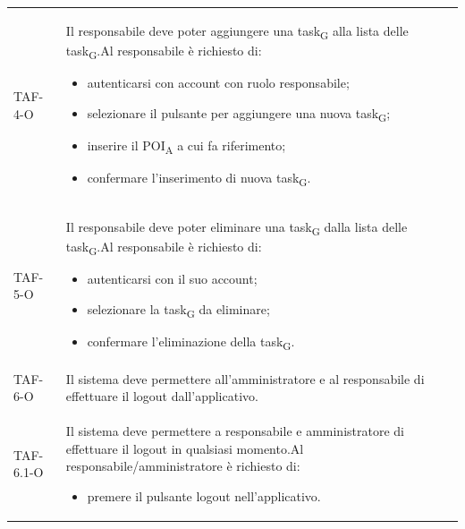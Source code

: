 \begin{longtable}{ >{\centering}p{} >{}p{}}
	TAF-4-O & Il responsabile deve poter aggiungere una task\textsubscript{G} alla lista delle task\textsubscript{G}.\newline Al responsabile è richiesto di: \begin{itemize}\item autenticarsi con account con ruolo responsabile; \item selezionare il pulsante per aggiungere una nuova task\textsubscript{G}; \item inserire il POI\textsubscript{A} a cui fa riferimento; \item confermare l'inserimento di nuova task\textsubscript{G}. \end{itemize}\tabularnewline



	TAF-5-O & Il responsabile deve poter eliminare una task\textsubscript{G} dalla lista delle task\textsubscript{G}.\newline Al responsabile è richiesto di: \begin{itemize} \item autenticarsi con il suo account; \item selezionare la task\textsubscript{G} da eliminare; \item confermare l'eliminazione della task\textsubscript{G}. \end{itemize}\tabularnewline

	TAF-6-O & Il sistema deve permettere all'amministratore e al responsabile di effettuare il logout dall'applicativo.\tabularnewline
	TAF-6.1-O & Il sistema deve permettere a responsabile e amministratore di effettuare il logout in qualsiasi momento.\newline Al responsabile/amministratore è richiesto di: \begin{itemize} \item premere il pulsante logout nell'applicativo. \end{itemize}\tabularnewline


\end{longtable}
